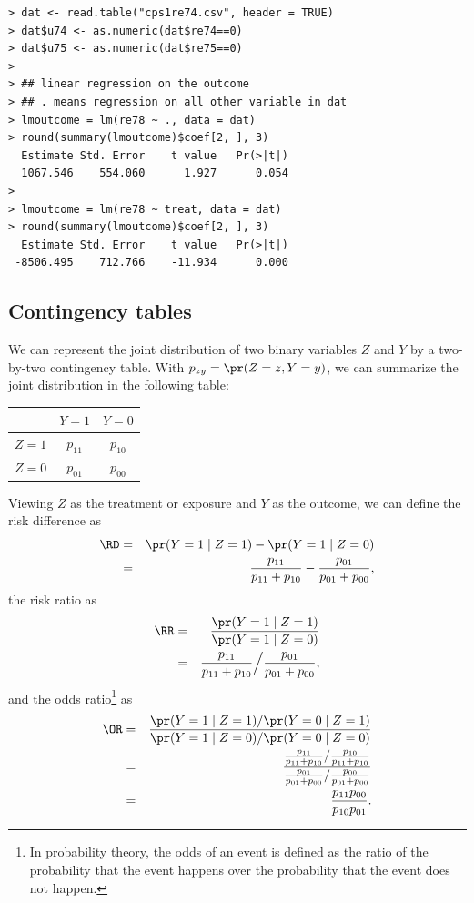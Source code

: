 \begin{lstlisting}
> dat <- read.table("cps1re74.csv", header = TRUE)
> dat$u74 <- as.numeric(dat$re74==0)
> dat$u75 <- as.numeric(dat$re75==0)
> 
> ## linear regression on the outcome
> ## . means regression on all other variable in dat
> lmoutcome = lm(re78 ~ ., data = dat)
> round(summary(lmoutcome)$coef[2, ], 3)
  Estimate Std. Error    t value   Pr(>|t|) 
  1067.546    554.060      1.927      0.054 
> 
> lmoutcome = lm(re78 ~ treat, data = dat)
> round(summary(lmoutcome)$coef[2, ], 3)
  Estimate Std. Error    t value   Pr(>|t|) 
 -8506.495    712.766    -11.934      0.000 
\end{lstlisting} 



 
 
 \subsection{Contingency tables}
 \label{sec::twobytwotables-withresume}
 
 We can represent the joint distribution of two binary variables $Z$ and $Y$ by a two-by-two contingency table. With $p_{zy} = \pr( Z=z, Y=y )$, we can summarize the joint distribution in the following table:
 
 
 \begin{center}
\begin{tabular}{lcc}
\hline 
        & $Y =1$ & $Y =0$\\\hline
$Z =1$ & $p_{11}$ & $p_{10}$\\ 
$Z =0$ & $p_{01}$ & $p_{00}$\\ 
\hline 
\end{tabular}
\end{center}
 
 
 Viewing $Z$ as the treatment or exposure and $Y$ as the outcome, we can define the risk difference as
\begin{eqnarray*}
\RD  &=& \pr(Y=1\mid Z=1) - \pr(Y=1\mid Z=0)  \\
&=& \frac{p_{11}}{ p_{11} + p_{10} } -  \frac{p_{01}}{ p_{01} + p_{00} } ,
\end{eqnarray*}
 the risk ratio as
\begin{eqnarray*}
 \RR &=&  \frac{ \pr(Y=1\mid Z=1)  }{    \pr(Y=1\mid Z=0)    }  \\
& =&   \frac{p_{11}}{ p_{11} + p_{10} }  \Big /  \frac{p_{01}}{ p_{01} + p_{00} } ,
\end{eqnarray*}
 and the odds ratio\footnote{In probability theory, the odds of an event is defined as the ratio of the probability that the event happens over the probability that the event does not happen.} as
\begin{eqnarray*}
 \OR &=& \frac{ \pr(Y=1\mid Z=1) /  \pr(Y=0\mid Z=1)  }{    \pr(Y=1\mid Z=0) /\pr(Y=0\mid Z=0)   }  \\
& =& \frac{      \frac{p_{11}}{ p_{11} + p_{10} } /  \frac{p_{10}}{ p_{11} + p_{10} }  }{  \frac{p_{01}}{ p_{01} + p_{00} } / \frac{p_{00}}{ p_{01} + p_{00} }     }  \\
 &=& \frac{ p_{11} p_{00}  }{  p_{10} p_{01} }.
\end{eqnarray*}

